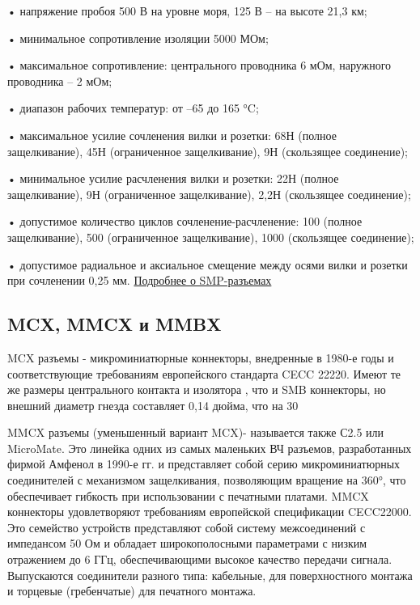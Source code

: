 \documentclass[%
	11pt,
	a4paper,
	utf8,
		]{article}
\begin{document}
•	 напряжение пробоя 500  В  на  уровне моря, 125  В  –
на высоте 21,3 км;

•	 минимальное сопротивление изоляции 5000 МОм;

•	 максимальное сопротивление: центрального проводника 6 мОм, наружного проводника – 2 мОм;

•	 диапазон рабочих температур: от –65 до 165 °C;

•	 максимальное усилие сочленения вилки и розетки:
68Н (полное защелкивание), 45Н (ограниченное
защелкивание), 9Н (скользящее соединение);

•	 минимальное усилие расчленения вилки и розетки:
22Н (полное защелкивание), 9Н (ограниченное защелкивание), 2,2Н (скользящее соединение);

•	 допустимое количество циклов сочленение-расчленение: 100 (полное защелкивание), 500 (ограниченное защелкивание), 1000 (скользящее соединение);

•	 допустимое радиальное и  аксиальное смещение между осями вилки и  розетки при сочленении 0,25 мм. \href{https://ecworld.ru/media/bip/pdfs/djurinsky_ntb615.pdf}{Подробнее о SMP-разъемах}

\subsection{MCX, MMCX и MMBX}

MCX разъемы - микроминиатюрные коннекторы, внедренные в 1980-е годы и соответствующие требованиям европейского стандарта CECC 22220. Имеют те же размеры центрального контакта и изолятора , что и SMB коннекторы, но внешний диаметр гнезда составляет 0,14 дюйма, что на 30%

MMCX разъемы (уменьшенный вариант MCX)- называется также С2.5 или MicroMate. Это линейка одних из самых маленьких ВЧ разъемов, разработанных фирмой Амфенол в 1990-е гг. и представляет собой серию микроминиатюрных соединителей с механизмом защелкивания, позволяющим вращение на 360°, что обеспечивает гибкость при использовании с печатными платами. MMCX коннекторы удовлетворяют требованиям европейской спецификации CECC22000. Это семейство устройств представляют собой систему межсоединений с импедансом 50 Ом и обладает широкополосными параметрами с низким отражением до 6 ГГц, обеспечивающими высокое качество передачи сигнала. Выпускаются соединители разного типа: кабельные, для поверхностного монтажа и торцевые (гребенчатые) для печатного монтажа.
\end{document}
